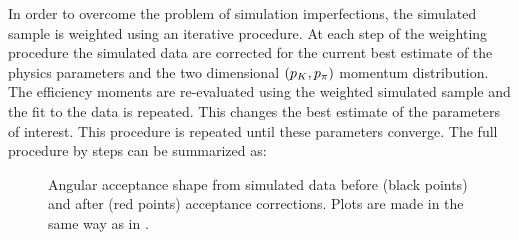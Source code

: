In order to overcome the problem of simulation imperfections, the simulated sample is weighted using an iterative procedure.
At each step of the weighting procedure the simulated data are corrected for the current best estimate of the physics
parameters and the two dimensional $(p_{K},p_{\pi})$ momentum distribution.
The efficiency moments are re-evaluated using the weighted simulated sample and the fit to the data is repeated.
This changes the best estimate of the parameters of interest. This procedure is repeated until these parameters
converge. The full procedure by steps can be summarized as:

\begin{figure}[!t]
  \centering
  \begin{subfigure}{0.49\textwidth}
    \raggedright
    \scalebox{1.13}{}
    \caption{}
    \label{angAccCor_ctk}
  \end{subfigure}%
  \hfill%
  \begin{subfigure}{0.49\textwidth}
    \raggedleft
    \scalebox{1.13}{}
    \caption{}
    \label{angAccCorr_ctl}
  \end{subfigure}
  \vspace*{0.02\textwidth}
  \begin{subfigure}{0.49\textwidth}
    \raggedright
    \scalebox{1.13}{}
    \caption{}
    \label{angAccCorr_phi}
  \end{subfigure}
  \caption{Angular acceptance shape from simulated data before (black points) and after (red points) acceptance corrections.
           Plots are made in the same way as in .}
  \label{angAggCorrections}
\end{figure}


